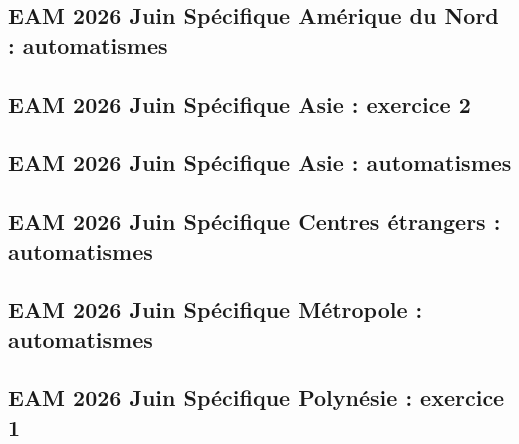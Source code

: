 \documentclass[lang=fr,edition=teacher,layout=sheet]{mxbook}
\begin{document}
\par\bigskip
{}\subsection*{EAM 2026 Juin Spécifique Amérique du Nord : automatismes}
\begingroup\endgroup
\par\bigskip
{}\subsection*{EAM 2026 Juin Spécifique Asie : exercice 2}
\begingroup\endgroup
\par\bigskip
{}\subsection*{EAM 2026 Juin Spécifique Asie : automatismes}
\begingroup\endgroup
\par\bigskip
{}\subsection*{EAM 2026 Juin Spécifique Centres étrangers : automatismes}
\begingroup\endgroup
\par\bigskip
{}\subsection*{EAM 2026 Juin Spécifique Métropole : automatismes}
\begingroup\endgroup
\par\bigskip
{}\subsection*{EAM 2026 Juin Spécifique Polynésie : exercice 1}
\begingroup\endgroup
\par\bigskip
\end{document}
